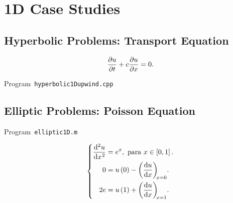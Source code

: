 
\chapter{1D Case Studies}

\section{Hyperbolic Problems: Transport Equation}

\begin{equation*}
	\diffp{u}{t}+c\diffp{u}{x}=
	0.
\end{equation*}

\begin{listing}[ht!]
	\tiny
	\centering
	\caption{Program~\texttt{hyperbolic1Dupwind.cpp}}
	\label{code:hyperbolic1Dupwind.cpp}
\end{listing}

\section{Elliptic Problems: Poisson Equation}

\begin{listing}[ht!]
	\tiny
	\centering
	\caption{Program~\texttt{elliptic1D.m}}
	\label{code:elliptic1D.m}
\end{listing}

\begin{equation}\label{eq:poisson1drobindconditions}
	\left\{
	\begin{aligned}
		\diff[2]{u}{x}
		 & =e^{x},
		\text{ para }x\in\left[0,1\right].     \\
		0
		 & = u\left(0\right)-\diff{u}{x}[x=0]. \\
		2e
		 & =u\left(1\right)+\diff{u}{x}[x=1].
	\end{aligned}
	\right.
\end{equation}

